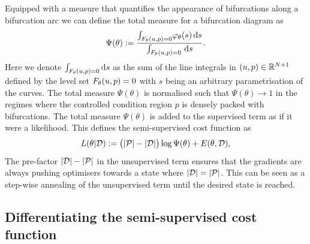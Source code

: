 \documentclass{article}
\begin{document}
Equipped with a measure that quantifies the appearance of bifurcations along a bifurcation arc we can define the total measure for a bifurcation diagram as
\begin{equation}
    \Psi(\theta):=\frac{
        \int_{F_{\theta}(u,p)=0}\!
        \varphi_{\theta}(s)\,\mathrm{d}s
    }{
        \int_{F_{\theta}(u,p)=0}\!\
        \mathrm{d}s
    }.
    \label{eq:total-measure}
\end{equation}
Here we denote $\int_{F_{\theta}(u,p)=0}\mathrm{d}s$ as the sum of the line integrals in $(u,p)\in\mathbb{R}^{N+1}$ defined by the level set $F_{\theta}(u,p)=0$ with $s$ being an arbitrary parametrisation of the curves. The total measure $\Psi(\theta)$ is normalised such that $\Psi(\theta)\rightarrow1$ in the regimes where the controlled condition region $p$ is densely packed with bifurcations. The total measure $\Psi(\theta)$ is added to the supervised term as if it were a likelihood. This defines the semi-supervised cost function as
\begin{align}
    L(\theta|\mathcal{D}):=
    \big(|\mathcal{P}|-|\mathcal{D}|\big)\log\Psi(\theta)+
    E(\theta, \mathcal{D}),
    \label{eq:loss}
\end{align}
The pre-factor $|\mathcal{D}|-|\mathcal{P}|$ in the unsupervised term ensures that the gradients are always pushing optimisers towards a state where $|\mathcal{D}|=|\mathcal{P}|$. This can be seen as a step-wise annealing of the unsupervised term until the desired state is reached.

\subsection{Differentiating the semi-supervised cost function}
\end{document}
